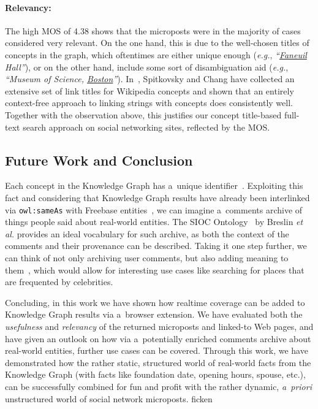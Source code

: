 \paragraph{Relevancy:} \label{sec:relevancy}
The high MOS of 4.38 shows that the microposts
were in the majority of cases considered very relevant.
On the one hand, this is due to the well-chosen titles of concepts in the graph,
which oftentimes are either unique enough (\emph{e.g.}, \emph{``\underline{Faneuil} Hall''}),
or on the other hand, include some sort of disambiguation aid
(\emph{e.g.}, \emph{``Museum of Science, \underline{Boston}''}).
In~\cite{spitkovsky2012}, Spitkovsky and Chang have collected
an extensive set of link titles for Wikipedia concepts
and shown that an entirely context-free approach
to linking strings with concepts does consistently well.
Together with the observation above, this justifies
our concept title-based full-text search approach on social networking sites,
reflected by the MOS.

\subsection{Future Work and Conclusion}
Each concept in the Knowledge Graph has a~unique identifier~\cite{thalhammer2012}.
Exploiting this fact and considering that Knowledge Graph results
have already been interlinked via \texttt{owl:sameAs}
with Freebase entities~\cite{glaser2012},
we can imagine a~comments archive of things people said about real-world entities.
The SIOC Ontology~\cite{breslin2005} by Breslin \emph{et al.}
provides an ideal vocabulary for such archive,
as both the context of the comments and their provenance can be described.
Taking it one step further, we can think of not only archiving user comments,
but also adding meaning to them~\cite{steiner2013},
which would allow for interesting use cases
like searching for places that are frequented by celebrities.

Concluding, in this work we have shown how realtime coverage
can be added to Knowledge Graph results via a~browser extension.
We have evaluated both the \emph{usefulness} and \emph{relevancy}
of the returned microposts and linked-to Web pages,
and have given an outlook on how via a~potentially enriched comments archive
about real-world entities, further use cases can be covered.
Through this work, we have demonstrated how the rather static, structured world
of real-world facts from the Knowledge Graph
(with facts like foundation date, opening hours, spouse, etc.),
can be successfully combined for fun and profit
with the rather dynamic, \emph{a~priori} unstructured world
of social network microposts.
ficken


